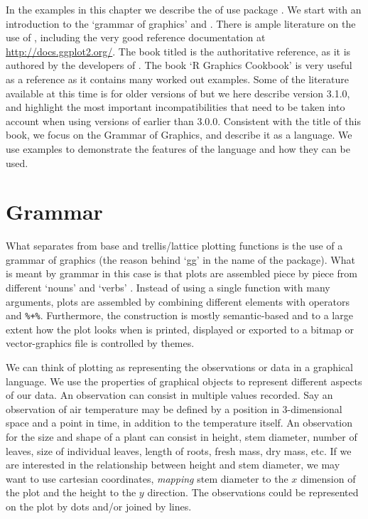 \documentclass[krantz2]{krantz}\usepackage{knitr}%
\begin{document}
In the examples in this chapter we describe the of use package \ggplot. We start with an introduction to the `grammar of graphics' and \ggplot. There is ample literature on the use of \ggplot, including the very good reference documentation at \url{http://docs.ggplot2.org/}. The book titled  \autocite{Wickham2016} is the authoritative reference, as it is authored by the developers of \ggplot. The book `R Graphics Cookbook' \autocite{Chang2013} is very useful as a reference as it contains many worked out examples. Some of the literature available at this time is for older versions of \ggplot but we here describe version 3.1.0, and highlight the most important incompatibilities that need to be taken into account when using versions of \ggplot earlier than 3.0.0. Consistent with the title of this book, we focus on the Grammar of Graphics, and describe it as a language. We use examples to demonstrate the features of the language and how they can be used.

\section{Grammar}

What separates \ggplot from base \Rlang and trellis/lattice plotting functions is the use of a grammar of graphics (the reason behind `gg' in the name of the package). What is meant by grammar in this case is that plots are assembled piece by piece from different `nouns' and `verbs' \autocite{Cleveland1985}. Instead of using a single function with many arguments, plots are assembled by combining different elements with operators \code{+} and \verb|%+%|. Furthermore, the construction is mostly semantic-based and to a large extent how the plot looks when is printed, displayed or exported to a bitmap or vector-graphics file is controlled by themes.

We can think of plotting as representing the observations or data in a graphical language. We use the properties of graphical objects to represent different aspects of our data. An observation can consist in multiple values recorded. Say an observation of air temperature may be defined by a position in 3-dimensional space and a point in time, in addition to the temperature itself. An observation for the size and shape of a plant can consist in height, stem diameter, number of leaves, size of individual leaves, length of roots, fresh mass, dry mass, etc. If we are interested in the relationship between height and stem diameter, we may want to use cartesian coordinates, \emph{mapping} stem diameter to the $x$ dimension of the plot and the height to the $y$ direction. The observations could be represented on the plot by dots and/or joined by lines.
\end{document}
